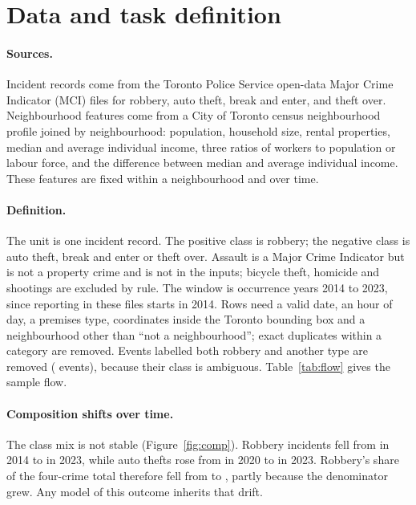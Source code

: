 \section{Data and task definition}
\paragraph{Sources.} Incident records come from the Toronto Police Service open-data Major Crime Indicator (MCI) files for robbery, auto theft, break and enter, and theft over. Neighbourhood features come from a City of Toronto census neighbourhood profile joined by neighbourhood: population, household size, rental properties, median and average individual income, three ratios of workers to population or labour force, and the difference between median and average individual income. These features are fixed within a neighbourhood and over time.

\paragraph{Definition.} The unit is one incident record. The positive class is robbery; the negative class is auto theft, break and enter or theft over. Assault is a Major Crime Indicator but is not a property crime and is not in the inputs; bicycle theft, homicide and shootings are excluded by rule. The window is occurrence years 2014 to 2023, since reporting in these files starts in 2014. Rows need a valid date, an hour of day, a premises type, coordinates inside the Toronto bounding box and a neighbourhood other than ``not a neighbourhood''; exact duplicates within a category are removed. Events labelled both robbery and another type are removed ( events), because their class is ambiguous. Table~\ref{tab:flow} gives the sample flow.

\begin{table}[t]
\centering\small
\caption{Sample flow and class counts. Each removal is a row count; the steps add up to the unified table.}\label{tab:flow}

\end{table}

\paragraph{Composition shifts over time.} The class mix is not stable (Figure~\ref{fig:comp}). Robbery incidents fell from  in 2014 to  in 2023, while auto thefts rose from  in 2020 to  in 2023. Robbery's share of the four-crime total therefore fell from  to , partly because the denominator grew. Any model of this outcome inherits that drift.

